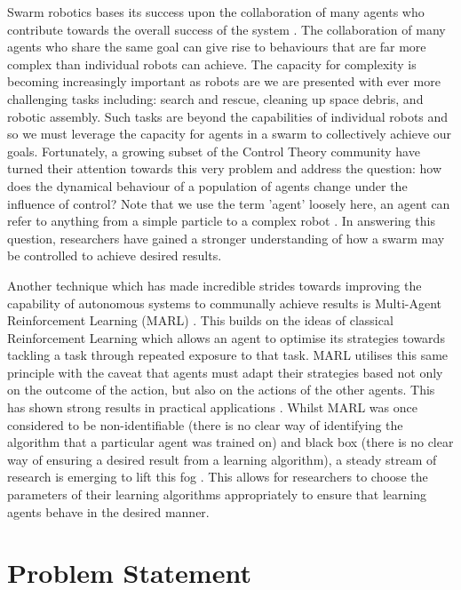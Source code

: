 \documentclass[.../main.tex]{subfiles}
\begin{document}
    Swarm robotics bases its success upon the collaboration of many agents who contribute towards
    the overall success of the system \cite{Hamann2018}. The collaboration of many agents
    who share the same goal can give rise to behaviours that are far more complex than individual
    robots can achieve. The capacity for complexity is becoming increasingly important as robots are
    we are presented with ever more challenging tasks including: search and rescue, cleaning up
    space debris, and robotic assembly. Such tasks are beyond the capabilities of individual robots
    and so we must leverage the capacity for agents in a swarm to collectively achieve our
    goals. Fortunately, a growing subset of the Control Theory community have turned their attention
    towards this very problem and address the question: how does the dynamical behaviour of a
    population of agents change under the influence of control? Note that we use the term 'agent'
    loosely here, an agent can refer to anything from a simple particle \cite{Roy2017}
    to a complex robot \cite{Elamvazhuthi2019}. In answering this question, researchers have
    gained a stronger understanding of how a swarm may be controlled to achieve desired results.

    Another technique which has made incredible strides towards improving the capability of
    autonomous systems to communally achieve results is Multi-Agent Reinforcement Learning (MARL)
    \cite{SchwartzMulti-agentApproach}. This builds on the ideas of classical Reinforcement Learning which allows an
    agent to optimise its strategies towards tackling a task through repeated exposure to that task.
    MARL utilises this same principle with the caveat that agents must adapt their strategies based
    not only on the outcome of the action, but also on the actions of the other agents. This has
    shown strong results in practical applications \cite{Woolridge2009, SchwartzMulti-agentApproach, Yang2004}. Whilst MARL was
    once considered to be non-identifiable (there is no clear way of identifying the algorithm that
    a particular agent was trained on) and black box (there is no clear way of ensuring a desired
    result from a learning algorithm), a steady stream of research is emerging to lift this fog
    \cite{Bloembergen2015}. This allows for researchers to choose the parameters of their learning
    algorithms appropriately to ensure that learning agents behave in the desired manner.

    \section{Problem Statement} \label{sec::Problem_Statement}
\end{document}
